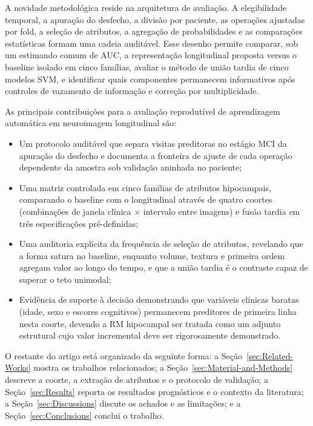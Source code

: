\documentclass[review]{elsarticle}
\begin{document}
	A novidade metodológica reside na arquitetura de avaliação. A elegibilidade temporal, a apuração do desfecho, a divisão por paciente, as operações ajustadas por fold, a seleção de atributos, a agregação de probabilidades e as comparações estatísticas formam uma cadeia auditável. Esse desenho permite comparar, sob um estimando comum de AUC, a representação longitudinal proposta versus o baseline isolado em cinco famílias, avaliar o método de união tardia de cinco modelos SVM, e identificar quais componentes permanecem informativos após controles de vazamento de informação e correção por multiplicidade.
	
	As principais contribuições para a avaliação reprodutível de aprendizagem automática em neuroimagem longitudinal são:
	\begin{itemize}
		\item Um protocolo auditável que separa visitas preditoras no estágio MCI da apuração do desfecho e documenta a fronteira de ajuste de cada operação dependente da amostra sob validação aninhada no paciente;
		
		\item Uma matriz controlada em cinco famílias de atributos hipocampais, comparando o baseline com o longitudinal através de quatro coortes (combinações de janela clínica $\times$ intervalo entre imagens) e fusão tardia em três especificações pré-definidas;
	
		\item Uma auditoria explícita da frequência de seleção de atributos, revelando que a forma satura no baseline, enquanto volume, textura e primeira ordem agregam valor ao longo do tempo, e que a união tardia é o contraste capaz de superar o teto unimodal;
		
		\item Evidência de suporte à decisão demonstrando que variáveis clínicas baratas (idade, sexo e escores cognitivos) permanecem preditores de primeira linha nesta coorte, devendo a RM hipocampal ser tratada como um adjunto estrutural cujo valor incremental deve ser rigorosamente demonstrado.
	\end{itemize}
	
	O restante do artigo está organizado da seguinte forma: a Seção~\ref{sec:Related-Works} mostra os trabalhos relacionados; a Seção~\ref{sec:Material-and-Methods} descreve a coorte, a extração de atributos e o protocolo de validação; a Seção~\ref{sec:Results} reporta os resultados prognósticos e o contexto da literatura; a Seção~\ref{sec:Discussions} discute os achados e as limitações; e a Seção~\ref{sec:Conclusions} conclui o trabalho.
\end{document}
